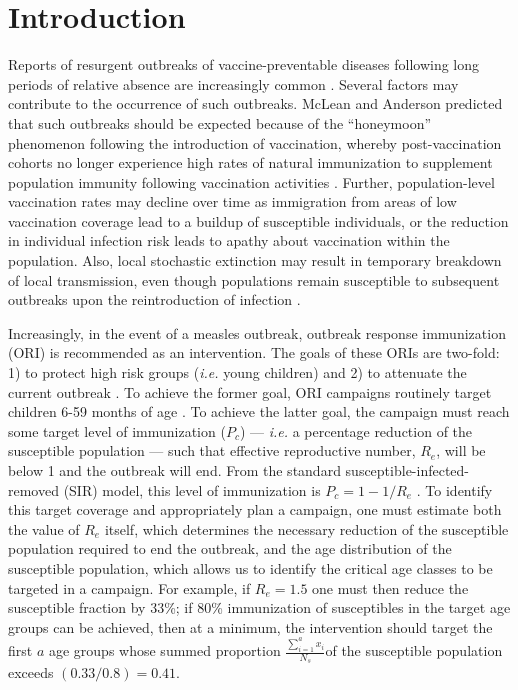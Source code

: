 \section{Introduction}\label{introduction}

Reports of resurgent outbreaks of vaccine-preventable diseases following long periods of relative absence are  increasingly common \cite{Hersh_1991, Cherry_2012, Celentano_2005, Shibeshi_2014}. Several factors may contribute to the occurrence of such outbreaks. McLean and Anderson \cite{McLean_1988} predicted that such outbreaks should be expected because of the ``honeymoon'' phenomenon following the introduction of vaccination, whereby post-vaccination cohorts no longer experience high rates of natural immunization to supplement population immunity following vaccination activities \cite{Jansen_2003}. Further, population-level vaccination rates may decline over time as immigration from areas of low vaccination coverage lead to a buildup of susceptible individuals, or the reduction in individual infection risk \cite{Omer_2009} leads to apathy about vaccination within the population. Also, local stochastic extinction may result in temporary breakdown of local transmission, even though populations remain susceptible to subsequent outbreaks upon the reintroduction of infection \cite{Ferrari_2008}.

Increasingly, in the event of a measles outbreak, outbreak response immunization (ORI) is recommended as an intervention. The goals of these ORIs are two-fold: 1) to protect high risk groups (\emph{i.e.} young children) and 2) to attenuate the current outbreak \cite{Cairns_2011,Grais_2011}. To achieve the former goal, ORI campaigns routinely target children 6-59 months of age \cite{Cairns_2011}. To achieve the latter goal, the campaign must reach some target level of immunization (\(P_c\)) --- \emph{i.e.} a percentage reduction of the susceptible population --- such that effective reproductive number, \(R_e\), will be below 1 and the outbreak will end. From the standard susceptible-infected-removed (SIR) model, this level of immunization is \(P_c = 1-1/R_e\) \cite{Anderson_1981}. To identify this target coverage and appropriately plan a campaign, one must estimate both the value of \(R_e\) itself, which determines the necessary reduction of the susceptible population required to end the outbreak, and the age distribution of the susceptible population, which allows us to identify the critical age classes to be targeted in a campaign. For example, if \(R_e=1.5\) one must then reduce the susceptible fraction by 33\%; if 80\% immunization of susceptibles in the target age groups can be achieved, then at a minimum, the intervention should target the first $a$ age groups whose summed proportion $\frac{\sum_{i=1}^a x_i}{N_s}$of the susceptible population exceeds $(0.33/0.8) = 0.41$.

